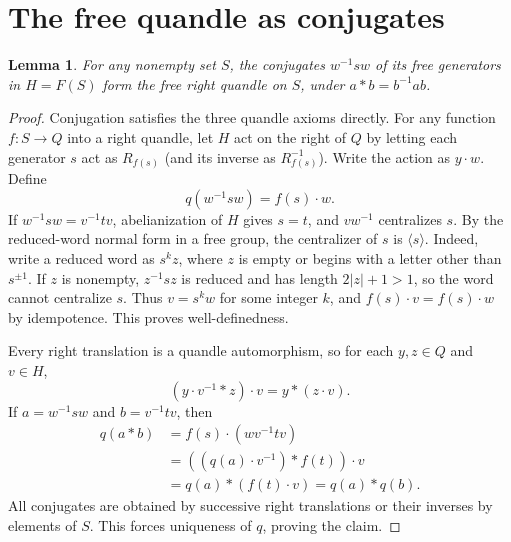\documentclass[11pt,a4paper]{article}
\newtheorem{lemma}[theorem]{Lemma}
\begin{document}
\section{The free quandle as conjugates}
\begin{lemma}\label{freeq}
For any nonempty set $S$, the conjugates $w^{-1}sw$ of its free generators in $H=F(S)$ form the free right quandle on $S$, under $a*b=b^{-1}ab$.
\end{lemma}
\begin{proof}
Conjugation satisfies the three quandle axioms directly. For any function $f:S\to Q$ into a right quandle, let $H$ act on the right of $Q$ by letting each generator $s$ act as $R_{f(s)}$ (and its inverse as $R_{f(s)}^{-1}$). Write the action as $y\cdot w$. Define
\[
q(w^{-1}sw)=f(s)\cdot w.
\]
If $w^{-1}sw=v^{-1}tv$, abelianization of $H$ gives $s=t$, and $vw^{-1}$ centralizes $s$. By the reduced-word normal form in a free group, the centralizer of $s$ is $\langle s\rangle$. Indeed, write a reduced word as $s^k z$, where $z$ is empty or begins with a letter other than $s^{\pm1}$. If $z$ is nonempty, $z^{-1}sz$ is reduced and has length $2|z|+1>1$, so the word cannot centralize $s$. Thus $v=s^k w$ for some integer $k$, and $f(s)\cdot v=f(s)\cdot w$ by idempotence. This proves well-definedness.

Every right translation is a quandle automorphism, so for each $y,z\in Q$ and $v\in H$,
\[
(y\cdot v^{-1}*z)\cdot v=y*(z\cdot v).
\]
If $a=w^{-1}sw$ and $b=v^{-1}tv$, then
\[
\begin{aligned}
q(a*b)&=f(s)\cdot(wv^{-1}tv)\\
&=((q(a)\cdot v^{-1})*f(t))\cdot v\\
&=q(a)*(f(t)\cdot v)=q(a)*q(b).
\end{aligned}
\]
All conjugates are obtained by successive right translations or their inverses by elements of $S$. This forces uniqueness of $q$, proving the claim.
\end{proof}
\end{document}
